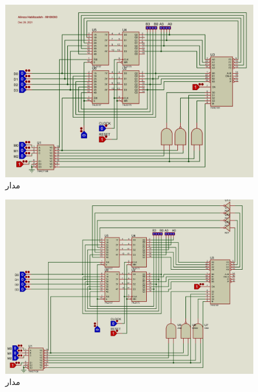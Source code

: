 \begin{figure}[h!]
    \centering
    \includegraphics[width=\textwidth]{part1/74181.png}
    \caption{
    مدار
    }
\end{figure}

\begin{figure}[h!]
    \centering
    \includegraphics[width=\textwidth]{part1/74181-ActiveLow.png}
    \caption{
    مدار
    }
\end{figure}

\newpage